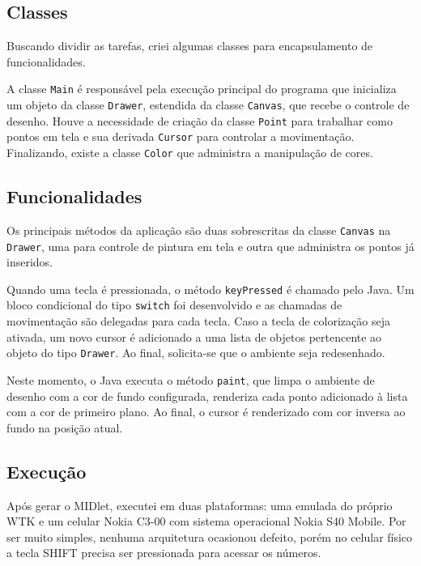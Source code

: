 \documentclass{article}
\begin{document}
\subsection{Classes}

Buscando dividir as tarefas, criei algumas classes para encapsulamento de
funcionalidades.

A classe \texttt{Main} é responsável pela execução principal do programa que
inicializa um objeto da classe \texttt{Drawer}, estendida da classe
\texttt{Canvas}, que recebe o controle de desenho. Houve a necessidade de
criação da classe \texttt{Point} para trabalhar como pontos em tela e sua
derivada \texttt{Cursor} para controlar a movimentação. Finalizando, existe a
classe \texttt{Color} que administra a manipulação de cores.

\subsection{Funcionalidades}

Os principais métodos da aplicação são duas sobrescritas da classe
\texttt{Canvas} na \texttt{Drawer}, uma para controle de pintura em tela e
outra que administra os pontos já inseridos.

Quando uma tecla é pressionada, o método \texttt{keyPressed} é chamado pelo
Java. Um bloco condicional do tipo \texttt{switch} foi desenvolvido e as
chamadas de movimentação são delegadas para cada tecla. Caso a tecla de
colorização seja ativada, um novo cursor é adicionado a uma lista de objetos
pertencente ao objeto do tipo \texttt{Drawer}. Ao final, solicita-se que o
ambiente seja redesenhado.

Neste momento, o Java executa o método \texttt{paint}, que limpa o ambiente de
desenho com a cor de fundo configurada, renderiza cada ponto adicionado à lista
com a cor de primeiro plano. Ao final, o cursor é renderizado com cor inversa ao
fundo na posição atual.

\subsection{Execução}

Após gerar o MIDlet, executei em duas plataformas: uma emulada do próprio WTK e
um celular Nokia C3-00 com sistema operacional Nokia S40 Mobile. Por ser muito
simples, nenhuma arquitetura ocasionou defeito, porém no celular físico a tecla
SHIFT precisa ser pressionada para acessar os números.

\end{document}
